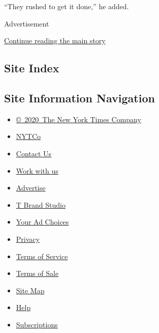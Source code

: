 ``They rushed to get it done,'' he added.

Advertisement

\protect\hyperlink{after-bottom}{Continue reading the main story}

\hypertarget{site-index}{%
\subsection{Site Index}\label{site-index}}

\hypertarget{site-information-navigation}{%
\subsection{Site Information
Navigation}\label{site-information-navigation}}

\begin{itemize}
\tightlist
\item
  \href{https://help.nytimes3xbfgragh.onion/hc/en-us/articles/115014792127-Copyright-notice}{©~2020~The
  New York Times Company}
\end{itemize}

\begin{itemize}
\tightlist
\item
  \href{https://www.nytco.com/}{NYTCo}
\item
  \href{https://help.nytimes3xbfgragh.onion/hc/en-us/articles/115015385887-Contact-Us}{Contact
  Us}
\item
  \href{https://www.nytco.com/careers/}{Work with us}
\item
  \href{https://nytmediakit.com/}{Advertise}
\item
  \href{http://www.tbrandstudio.com/}{T Brand Studio}
\item
  \href{https://www.nytimes3xbfgragh.onion/privacy/cookie-policy\#how-do-i-manage-trackers}{Your
  Ad Choices}
\item
  \href{https://www.nytimes3xbfgragh.onion/privacy}{Privacy}
\item
  \href{https://help.nytimes3xbfgragh.onion/hc/en-us/articles/115014893428-Terms-of-service}{Terms
  of Service}
\item
  \href{https://help.nytimes3xbfgragh.onion/hc/en-us/articles/115014893968-Terms-of-sale}{Terms
  of Sale}
\item
  \href{https://spiderbites.nytimes3xbfgragh.onion}{Site Map}
\item
  \href{https://help.nytimes3xbfgragh.onion/hc/en-us}{Help}
\item
  \href{https://www.nytimes3xbfgragh.onion/subscription?campaignId=37WXW}{Subscriptions}
\end{itemize}

